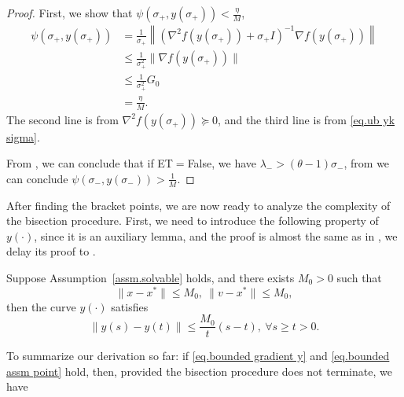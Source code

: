 \documentclass{mcom-l}
\numberwithin{equation}{section}
\begin{document}
\begin{proof}
    First, we show that $\psi(\sigma_+,y(\sigma_+))<\frac{\eta}{M}$,
    \begin{equation*}
        \begin{aligned}
            \psi(\sigma_+,y(\sigma_+)) & = \frac{1}{\sigma_+}\left \|\left(\nabla^2 f(y(\sigma_+))+\sigma_+ I\right)^{-1}\nabla f(y(\sigma_+))\right\| \\
                                       & \leq \frac{1}{\sigma_+^2}\|\nabla f(y(\sigma_+))\|                                                            \\
                                       & \leq \frac{1}{\sigma_+^2} G_0                                                                                 \\
                                       & = \frac{\eta}{M}.
        \end{aligned}
    \end{equation*}
    The second line is from $\nabla^2 f(y(\sigma_+))\succeq 0$, and the third line is from \eqref{eq.ub yk sigma}.

    From , we can conclude that if ET$=$False, we have $\lambda_- > (\theta-1)\sigma_-$, from  we can conclude $\psi(\sigma_-,y(\sigma_-))>\frac{1}{M}.$
\end{proof}
After finding the bracket points, we are now ready to analyze the complexity of the bisection procedure. First, we need to introduce the following property of $y(\cdot)$, since it is an auxiliary lemma, and the proof is almost the same as in \citet{monteiro2013accelerated}, we delay its proof to .
\begin{lemma}
    \label{lem.curve condition}
    Suppose Assumption~\ref{assm.solvable} holds, and there exists $M_0>0$ such that
    \begin{equation}\label{eq.bounded assm point}
        \|x-x^*\|\leq M_0, \ \|v-x^*\|\leq M_0,
    \end{equation}
    then the curve $y(\cdot)$ satisfies
    \begin{equation}
        \label{eq.curve condition}
        \|y(s)-y(t)\| \leq \frac{M_0}{t}(s-t), \ \forall s\geq t >0.
    \end{equation}
\end{lemma}
To summarize our derivation so far: if \eqref{eq.bounded gradient y} and \eqref{eq.bounded assm point} hold, then, provided the bisection procedure does not terminate, we have
\end{document}
